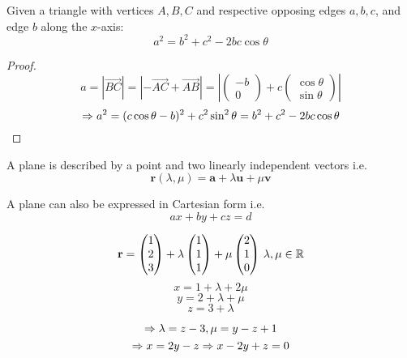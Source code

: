 \documentclass[a4paper,10pt]{article}
\begin{document}
\begin{thm}
	Given a triangle with vertices $A,B,C$ and respective opposing edges
	$a,b,c$, and edge $b$ along the $x$-axis:
	\[ a^2 = b^2 + c^2 - 2bc\cos\theta \]
\end{thm}

\begin{proof}
	\[
	a = |\vec{BC}| = |-\vec{AC} + \vec{AB}|
	= \left|\begin{pmatrix}-b\\0\end{pmatrix} +
		c\begin{pmatrix}\cos\theta\\\sin\theta\end{pmatrix}\right|
	\]
	\[
	\Rightarrow a^2 = (c\cos\theta - b)^2 + c^2\sin^2\theta
	= b^2 + c^2 - 2bc\cos\theta
	\]
\end{proof}

A plane is described by a point and two linearly independent vectors i.e.
\[\mathbf{r}(\lambda, \mu) = \mathbf{a} + \lambda \mathbf{u} + \mu \mathbf{v}\]

A plane can also be expressed in Cartesian form i.e.
\[ax + by + cz = d\]

\begin{ex}
	\[
		\mathbf{r} =
		\begin{pmatrix}
			1\\2\\3
		\end{pmatrix}
		+ \lambda
		\begin{pmatrix}
			1\\1\\1
		\end{pmatrix}
		+ \mu
		\begin{pmatrix}
			2\\1\\0
		\end{pmatrix}
		\, \lambda, \mu \in \mathbb{R}
	\]
	\[ x = 1 + \lambda + 2\mu \]
	\[ y = 2 + \lambda + \mu \]
	\[ z = 3 + \lambda \]

	\[ \Rightarrow \lambda = z - 3, \mu = y - z + 1 \]
	\[ \Rightarrow x = 2y - z \Rightarrow x - 2y + z = 0 \]
\end{ex}
\end{document}
